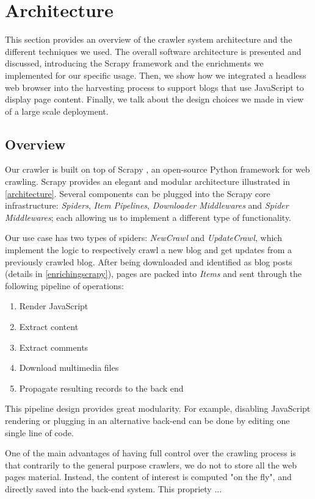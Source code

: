 \section{Architecture}
\label{architecture}

This section provides an overview of the crawler system architecture and the different techniques we used. The overall software architecture is presented and discussed, introducing the Scrapy framework and the enrichments we implemented for our specific usage. Then, we show how we integrated a headless web browser into the harvesting process to support blogs that use JavaScript to display page content. Finally, we talk about the design choices we made in view of a large scale deployment.

\subsection{Overview}

Our crawler is built on top of Scrapy \cite{scrapy2014}, an open-source Python framework for web crawling. Scrapy provides an elegant and modular architecture illustrated in \autoref{architecture}. Several components can be plugged into the Scrapy core infrastructure: \emph{Spiders}, \emph{Item Pipelines}, \emph{Downloader Middlewares} and \emph{Spider Middlewares}; each allowing us to implement a different type of functionality.

Our use case has two types of spiders: \emph{NewCrawl} and \emph{UpdateCrawl}, which implement the logic to respectively crawl a new blog and get updates from a previously crawled blog. After being downloaded and identified as blog posts (details in \autoref{enrichingscrapy}), pages are packed into \emph{Items} and sent through the following pipeline of operations:
\begin{enumerate}
  \item Render JavaScript
  \item Extract content
  \item Extract comments
  \item Download multimedia files
  \item Propagate resulting records to the back end
\end{enumerate}
This pipeline design provides great modularity. For example, disabling JavaScript rendering or plugging in an alternative back-end can be done by editing one single line of code.

One of the main advantages of having full control over the crawling process is that contrarily to the general purpose crawlers, we do not to store all the web pages material. Instead, the content of interest is computed "on the fly", and directly saved into the back-end system. This propriety ...

